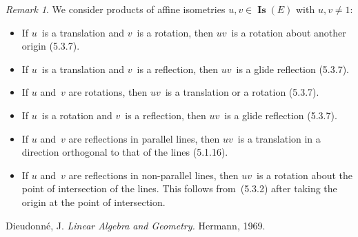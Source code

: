 \documentclass[letterpaper,12pt]{article}
\DeclareMathOperator{\Is}{\mathbf{Is}}
\theoremstyle{definition}
\theoremstyle{remark}
\newtheorem*{rmk}{Remark}
\begin{document}
\begin{rmk}
We consider products of affine isometries \(u,v\in\Is(E)\) with \(u,v\ne 1\):
\begin{itemize}[itemsep=0pt]
\item If \(u\)~is a translation and \(v\)~is a rotation, then \(uv\)~is a rotation about another origin (5.3.7).
\item If \(u\)~is a translation and \(v\)~is a reflection, then \(uv\)~is a glide reflection (5.3.7).
\item If \(u\) and~\(v\) are rotations, then \(uv\)~is a translation or a rotation (5.3.7).
\item If \(u\)~is a rotation and \(v\)~is a reflection, then \(uv\)~is a glide reflection (5.3.7).
\item If \(u\) and~\(v\) are reflections in parallel lines, then \(uv\)~is a translation in a direction orthogonal to that of the lines (5.1.16).
\item If \(u\) and~\(v\) are reflections in non-parallel lines, then \(uv\)~is a rotation about the point of intersection of the lines. This follows from~(5.3.2) after taking the origin at the point of intersection.
\end{itemize}
\end{rmk}

\begin{thebibliography}{0}
 Dieudonn\'e, J. \textit{Linear Algebra and Geometry.} Hermann, 1969.
\end{thebibliography}
\end{document}
